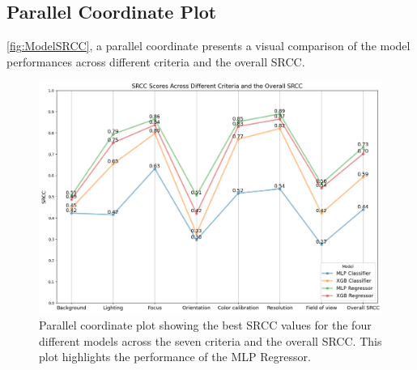 \subsection{Parallel Coordinate Plot}
\label{subsec:ParallelCoordinatePlot}
\autoref{fig:ModelSRCC}, a parallel coordinate presents a visual comparison of the model performances across different criteria and the overall SRCC. \par
\begin{figure}[ht]
    \centering
    \includegraphics[keepaspectratio,width=15cm]{img/Model_SRCC.png}
    \caption{Parallel coordinate plot showing the best SRCC values for the four different models across the seven criteria and the overall SRCC. This plot highlights the performance of the MLP Regressor.}
    \label{fig:ModelSRCC}
\end{figure}

